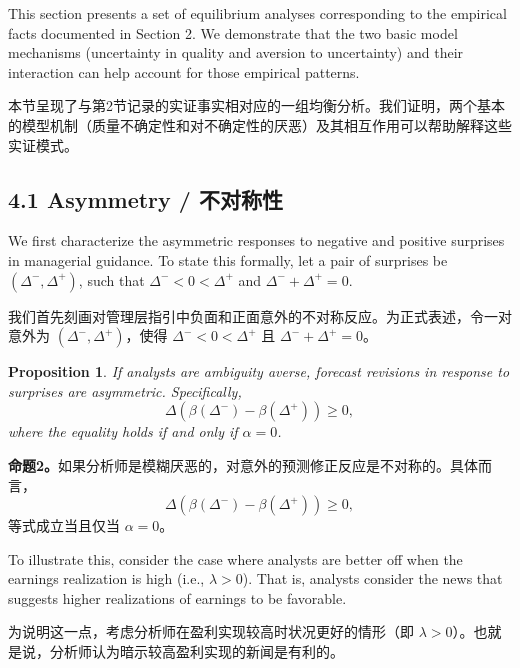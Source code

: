 \documentclass[12pt,a4paper]{article}
\newenvironment{original}
  {\par\medskip\noindent\ignorespaces}
  {\par\medskip}
\newenvironment{translation}
  {\par\noindent{\color{transblue}\ignorespaces}}
  {\par\bigskip}
\newtheorem{proposition}[theorem]{Proposition}
\begin{document}
\begin{original}
This section presents a set of equilibrium analyses corresponding to the empirical facts documented in Section 2. We demonstrate that the two basic model mechanisms (uncertainty in quality and aversion to uncertainty) and their interaction can help account for those empirical patterns.
\end{original}
\begin{translation}
本节呈现了与第2节记录的实证事实相对应的一组均衡分析。我们证明，两个基本的模型机制（质量不确定性和对不确定性的厌恶）及其相互作用可以帮助解释这些实证模式。
\end{translation}

\subsection{4.1 Asymmetry / 不对称性}

\begin{original}
We first characterize the asymmetric responses to negative and positive surprises in managerial guidance. To state this formally, let a pair of surprises be $(\Delta^-, \Delta^+)$, such that $\Delta^- < 0 < \Delta^+$ and $\Delta^- + \Delta^+ = 0$.
\end{original}
\begin{translation}
我们首先刻画对管理层指引中负面和正面意外的不对称反应。为正式表述，令一对意外为 $(\Delta^-, \Delta^+)$，使得 $\Delta^- < 0 < \Delta^+$ 且 $\Delta^- + \Delta^+ = 0$。
\end{translation}

\begin{proposition}
If analysts are ambiguity averse, forecast revisions in response to surprises are asymmetric. Specifically,
\[
\Delta(\beta(\Delta^-) - \beta(\Delta^+)) \geq 0,
\]
where the equality holds if and only if $\alpha = 0$.
\end{proposition}
\begin{translation}
\textbf{命题2。}如果分析师是模糊厌恶的，对意外的预测修正反应是不对称的。具体而言，
\[
\Delta(\beta(\Delta^-) - \beta(\Delta^+)) \geq 0,
\]
等式成立当且仅当 $\alpha = 0$。
\end{translation}

\begin{original}
To illustrate this, consider the case where analysts are better off when the earnings realization is high (i.e., $\lambda > 0$). That is, analysts consider the news that suggests higher realizations of earnings to be favorable.
\end{original}
\begin{translation}
为说明这一点，考虑分析师在盈利实现较高时状况更好的情形（即 $\lambda > 0$）。也就是说，分析师认为暗示较高盈利实现的新闻是有利的。
\end{translation}
\end{document}
